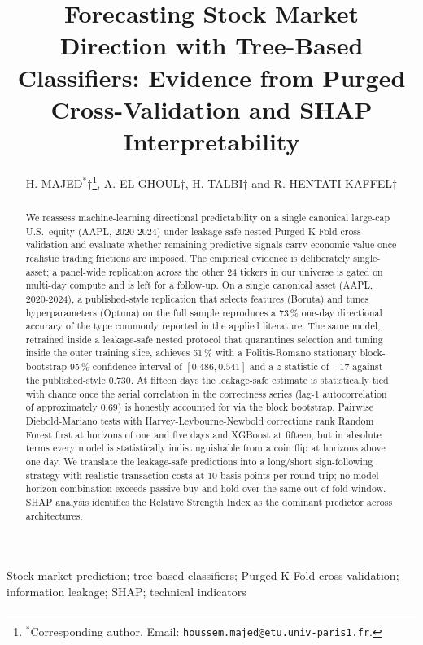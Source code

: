 \documentclass{rQUF2e}
\title{Forecasting Stock Market Direction with Tree-Based Classifiers:
Evidence from Purged Cross-Validation and SHAP Interpretability}
\author{
H. MAJED$^{\ast}$$\dag$\thanks{$^{\ast}$Corresponding author. Email:
\texttt{houssem.majed@etu.univ-paris1.fr}.},
A. EL GHOUL$\dag$, H. TALBI$\dag$ and R. HENTATI KAFFEL$\dag$\\
\affil{$\dag$Universit\'e Paris 1 Panth\'eon-Sorbonne, \'Ecole d'\'Economie
de la Sorbonne, France}
\received{\today}
}
\begin{document}
\maketitle

\begin{abstract}
\noindent We reassess machine-learning directional predictability on
a single canonical large-cap U.S.\ equity (AAPL, 2020-2024) under
leakage-safe nested Purged K-Fold cross-validation and evaluate
whether remaining predictive signals carry economic value once
realistic trading frictions are imposed. The empirical evidence is
deliberately single-asset; a panel-wide replication across the
other 24 tickers in our universe is gated on multi-day compute and
is left for a follow-up. On a single canonical
asset (AAPL, 2020-2024), a published-style replication that selects
features (Boruta) and tunes hyperparameters (Optuna) on the full
sample reproduces a 73\,\% one-day directional accuracy of the type
commonly reported in the applied literature. The same model,
retrained inside a leakage-safe nested protocol that quarantines
selection and tuning inside the outer training slice, achieves
51\,\% with a Politis-Romano stationary block-bootstrap 95\,\%
confidence interval of $[0.486, 0.541]$ and a $z$-statistic of
$-17$ against the published-style 0.730. At fifteen days the
leakage-safe estimate is statistically tied with chance once the
serial correlation in the correctness series (lag-1 autocorrelation
of approximately $0.69$) is honestly accounted for via the block
bootstrap. Pairwise Diebold-Mariano tests with
Harvey-Leybourne-Newbold corrections rank Random Forest first at
horizons of one and five days and XGBoost at fifteen, but in
absolute terms every model is statistically indistinguishable from
a coin flip at horizons above one day. We translate the
leakage-safe predictions into a long/short sign-following strategy
with realistic transaction costs at $10$ basis points per round
trip; no model-horizon combination exceeds passive buy-and-hold over
the same out-of-fold window. SHAP analysis identifies the Relative
Strength Index as the dominant predictor across architectures.
\end{abstract}

\vspace{0.3cm}

\begin{keywords}
Stock market prediction; tree-based classifiers;
Purged K-Fold cross-validation; information leakage; SHAP;
technical indicators
\end{keywords}
\end{document}
